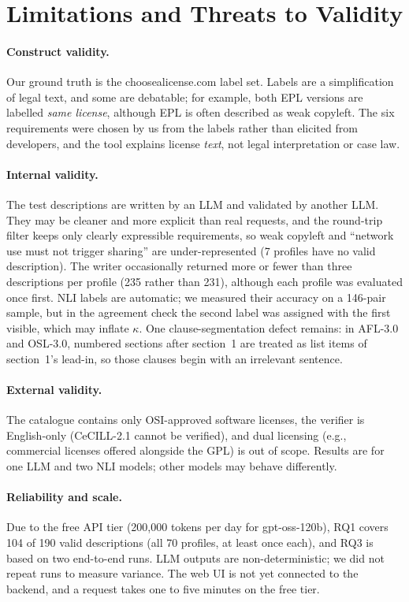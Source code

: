 \section{Limitations and Threats to Validity}
\label{s:limits}

\paragraph{Construct validity.}
Our ground truth is the choosealicense.com label set. Labels are a simplification of legal text, and some are debatable; for example, both EPL versions are labelled \emph{same license}, although EPL is often described as weak copyleft. The six requirements were chosen by us from the labels rather than elicited from developers, and the tool explains license \emph{text}, not legal interpretation or case law.

\paragraph{Internal validity.}
The test descriptions are written by an LLM and validated by another LLM. They may be cleaner and more explicit than real requests, and the round-trip filter keeps only clearly expressible requirements, so weak copyleft and ``network use must not trigger sharing'' are under-represented (7 profiles have no valid description). The writer occasionally returned more or fewer than three descriptions per profile (235 rather than 231), although each profile was evaluated once first. NLI labels are automatic; we measured their accuracy on a 146-pair sample, but in the agreement check the second label was assigned with the first visible, which may inflate $\kappa$. One clause-segmentation defect remains: in AFL-3.0 and OSL-3.0, numbered sections after section~1 are treated as list items of section~1's lead-in, so those clauses begin with an irrelevant sentence.

\paragraph{External validity.}
The catalogue contains only OSI-approved software licenses, the verifier is English-only (CeCILL-2.1 cannot be verified), and dual licensing (e.g., commercial licenses offered alongside the GPL) is out of scope. Results are for one LLM and two NLI models; other models may behave differently.

\paragraph{Reliability and scale.}
Due to the free API tier (200{,}000 tokens per day for gpt-oss-120b), RQ1 covers 104 of 190 valid descriptions (all 70 profiles, at least once each), and RQ3 is based on two end-to-end runs. LLM outputs are non-deterministic; we did not repeat runs to measure variance. The web UI is not yet connected to the backend, and a request takes one to five minutes on the free tier.
